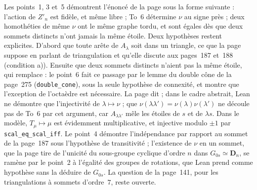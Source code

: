 \begin{remarque}
Les points~1, 3 et~5 démontrent l'énoncé de la page sous la forme suivante : l'action de $Z'_n$ est fidèle, et même libre ; To~6 détermine $\nu$ au signe près ; deux homothéties de même $\nu$ ont le même graphe tordu, et sont égales dès que deux sommets distincts n'ont jamais la même étoile. Deux hypothèses restent explicites. D'abord que toute arête de $A_\lambda$ soit dans un triangle, ce que la page suppose en parlant de triangulation et qu'elle discute aux pages~187 et~188 (condition a)). Ensuite que deux sommets distincts n'aient pas la même étoile, qui remplace  : le point~6 fait ce passage par le lemme du double cône de la page~275 (\texttt{double\_cone}), sous la seule hypothèse de connexité, et montre que l'exception de l'octaèdre est nécessaire. La page dit  ; dans le cadre abstrait, Lean ne démontre que l'injectivité de $\lambda \mapsto \nu$ ; que $\nu(\lambda\lambda') = \nu(\lambda)\nu(\lambda')$ ne découle pas de To~6 par cet argument, car $A_{\lambda\lambda'}$ mêle les étoiles de $s$ et de $\lambda s$. Dans le modèle, $T_\mu \mapsto \mu$ est évidemment multiplicative, et injective modulo $\pm 1$ par \texttt{scal\_eq\_scal\_iff}. Le point~4 démontre l'indépendance par rapport au sommet de la page~187 sous l'hypothèse de transitivité ; l'existence de $\nu$ en un sommet, que la page tire de l'unicité du sous-groupe cyclique d'ordre $n$ dans $G_{0s} \simeq \mathbf D_n$, se ramène par le point~2 à l'égalité des groupes de rotations, que Lean prend comme hypothèse sans la déduire de $G_{0s}$. La question de la page~141, pour les triangulations à sommets d'ordre~$7$, reste ouverte.
\end{remarque}
